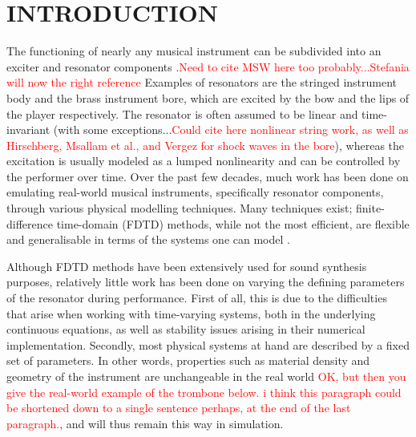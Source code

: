 \documentclass[fleqn]{jaes}
\def\SBcomment[#1]{\textcolor{red}{#1}}
\begin{document}
\section{INTRODUCTION}\label{sec:introduction}



The functioning of nearly any musical instrument can be subdivided into an exciter and resonator components \cite{Borin1989}.\SBcomment[Need to cite MSW here too probably...Stefania will now the right reference] Examples of resonators are the stringed instrument body and the brass instrument bore, which are excited by the bow and the lips of the player respectively. The resonator is often assumed to be linear and time-invariant (with some exceptions...\SBcomment[Could cite here nonlinear string work, as well as Hirschberg, Msallam et al., and Vergez for shock waves in the bore]), whereas the excitation is usually modeled as a lumped nonlinearity and can be controlled by the performer over time. Over the past few decades, much work has been done on emulating real-world musical instruments, specifically resonator components, through various physical modelling techniques. Many techniques exist; finite-difference time-domain (FDTD) methods, while not the most efficient, are flexible and generalisable in terms of the systems one can model \cite{Bilbao2009}.

Although FDTD methods have been extensively used for sound synthesis purposes, relatively little work has been done on varying the defining parameters of the resonator during performance. First of all, this is due to the difficulties that arise when working with time-varying systems, both in the underlying continuous equations, as well as stability issues arising in their numerical implementation. Secondly, most physical systems at hand are described by a fixed set of parameters. In other words, properties such as material density and geometry of the instrument are unchangeable in the real world \SBcomment[OK, but then you give the real-world example of the trombone below. i think this paragraph could be shortened down to a single sentence perhaps, at the end of the last paragraph.], and will thus remain this way in simulation.
\end{document}
